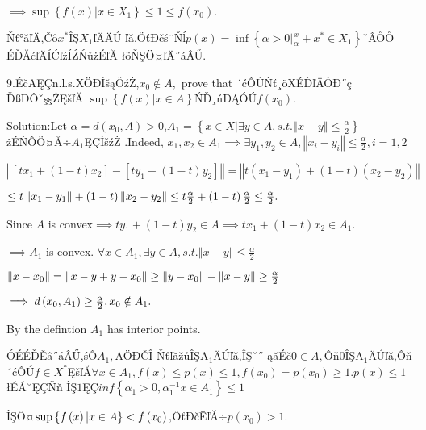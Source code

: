 \documentclass{article}
\begin{document}
\begin{CJK}{GBK}{song}
$\implies \sup \left\{ f\left( x\right) |x\in X_{1}\right\} \leq 1\leq
f\left( x_{0}\right) .$

Ňť°ăľÄ,Čô$x^{\ast }$ÎŞ$X_{1}$ľÄÄÚ%
ľă,ÖťĐčś¨Ňĺ$p\left( x\right) =\inf \left\{
\alpha >0|\frac{x}{\alpha }+x^{\ast }\in X_{1}\right\} $ˇÂŐŐ%
ÉĎĂćľÄÍĆľźÍŹŃůżÉľĂ%
łöŇŞÖ¤ľÄ˝áÂŰ.

9.ÉčAĘÇn.l.s.XÖĐÍšąŐźŻ,$x_{0}\notin A,$%
prove that ´ćÔÚŇť¸öXÉĎľÄÓĐ˝ç%
ĎßĐÔˇşşŻĘšľĂ $\sup \left\{ f\left(
x\right) |x\in A\right\} $ŃĎ¸ńĐĄÓÚ$f\left(
x_{0}\right) $.

Solution:Let $\alpha =d\left( x_{0},A\right) >0$,$A_{1}=\left\{ x\in
X|\exists y\in A,s.t.\left\Vert x-y\right\Vert \leq \frac{\alpha }{2}%
\right\} $żÉŇÔÖ¤Ă÷$A_{1}$ĘÇÍšźŻ%
.Indeed, $x_{1},x_{2}\in A_{1}\implies \exists y_{1},y_{2}\in A,\left\Vert
x_{i}-y_{i}\right\Vert \leq \frac{\alpha }{2},i=1,2$

$\left\Vert \left[ tx_{1}+\left( 1-t\right) x_{2}\right] -\left[
ty_{1}+\left( 1-t\right) y_{2}\right] \right\Vert =\left\Vert t\left(
x_{1}-y_{1}\right) +\left( 1-t\right) \left( x_{2}-y_{2}\right) \right\Vert $

$\leq t\left\Vert x_{1}-y_{1}\right\Vert +\left( 1-t\right) \left\Vert
x_{2}-y_{2}\right\Vert \leq t\frac{\alpha }{2}+\left( 1-t\right) \frac{%
\alpha }{2}\leq \frac{\alpha }{2}.$

Since $A$ is convex$\implies ty_{1}+\left( 1-t\right) y_{2}\in A\implies
tx_{1}+\left( 1-t\right) x_{2}\in A_{1}.$

$\implies A_{1}$ is convex. $\forall x\in A_{1},\exists y\in
A,s.t.\left\Vert x-y\right\Vert \leq \frac{\alpha }{2}$

$\left\Vert x-x_{0}\right\Vert =\left\Vert x-y+y-x_{0}\right\Vert \geq
\left\Vert y-x_{0}\right\Vert -\left\Vert x-y\right\Vert \geq \frac{\alpha }{%
2}$

$\bigskip \implies d\left( x_{0},A_{1}\right) \geq \frac{\alpha }{2}%
,x_{0}\notin A_{1}.$

By the defintion $A_{1}$ has interior points.

ÓÉÉĎĚâ˝áÂŰ,śÔ$A_{1},$AÖĐČÎ%
ŇťľăžůÎŞA$_{1}$ÄÚľă,ÎŞˇ˝%
ąăÉč0$\in A,$Ôň0ÎŞA$_{1}$ÄÚľă,Ôň%
´ćÔÚ$f\in X^{\ast }$ĘšľĂ$\forall x\in A_{1},f\left(
x\right) \leq p\left( x\right) \leq 1,f\left( x_{0}\right) =p\left(
x_{0}\right) \geq 1.p\left( x\right) \leq 1$łÉÁ˘ĘÇŇň%
ÎŞ$1$ĘÇ$inf\left\{ \alpha _{1}>0,\alpha _{1}^{-1}x\in
A_{1}\right\} \leq 1$

ÎŞÖ¤$\bigskip \sup \left\{ f\left( x\right) |x\in A\right\}
<f\left( x_{0}\right) ,$ÖťĐčËľĂ÷$p\left(
x_{0}\right) >1.$


\end{CJK}
\end{document}
